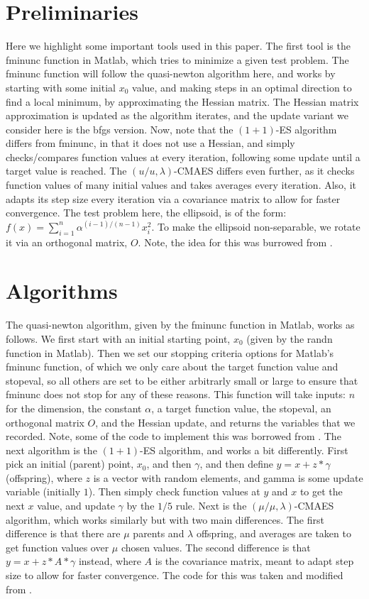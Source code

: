 \documentclass[sigconf, 6pt]{acmart}
\begin{document}
\section{Preliminaries}
\label{sec:pre}
Here we highlight some important tools used in this paper. The first tool is the fminunc function in Matlab, which tries to minimize a given test problem. The fminunc function will follow the quasi-newton algorithm here, and works by starting with some initial $x_0$ value, and making steps in an optimal direction to find a local minimum, by approximating the Hessian matrix. The Hessian matrix approximation is updated as the algorithm iterates, and the update variant we consider here is the bfgs version. Now, note that the $(1+1)$-ES algorithm differs from fminunc, in that it does not use a Hessian, and simply checks/compares function values at every iteration, following some update until a target value is reached. The $(u/u,\lambda)$-CMAES differs even further, as it checks function values of many initial values and takes averages every iteration. Also, it adapts its step size every iteration via a covariance matrix to allow for faster convergence. The test problem here, the ellipsoid, is of the form: $f(x)=\sum^n_{i=1}\alpha^{(i-1)/(n-1)} x_i^2$. To make the ellipsoid non-separable, we rotate it via an orthogonal matrix, $O$. Note, the idea for this was burrowed from \cite{orthogonal}.


\section{Algorithms}
\label{algorithm}
The quasi-newton algorithm, given by the fminunc function in Matlab, works as follows. We first start with an initial starting point, $x_0$ (given by the randn function in Matlab). Then we set our stopping criteria options for Matlab's fminunc function, of which we only care about the target function value and stopeval, so all others are set to be either arbitrarly small or large to ensure that fminunc does not stop for any of these reasons. This function will take inputs: $n$ for the dimension, the constant $\alpha$, a target function value, the stopeval, an orthogonal matrix $O$, and the Hessian update, and returns the variables that we recorded. Note, some of the code to implement this was borrowed from \cite{MathWorks}. The next algorithm is the $(1+1)$-ES algorithm, and works a bit differently. First pick an initial (parent) point, $x_0$, and then $\gamma$, and then define $y = x + z*\gamma$ (offspring), where $z$ is a vector with random elements, and gamma is some update variable (initially $1$). Then simply check function values at $y$ and $x$ to get the next $x$ value, and update $\gamma$ by the $1/5$ rule. Next is the $(\mu / \mu, \lambda)$-CMAES algorithm, which works similarly but with two main differences. The first difference is that there are $\mu$ parents and $\lambda$ offspring, and averages are taken to get function values over $\mu$ chosen values. The second difference is that $y = x + z*A*\gamma$ instead, where $A$ is the covariance matrix, meant to adapt step size to allow for faster convergence. The code for this was taken and modified from \cite{pureCMAES}.
\end{document}
